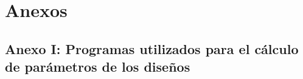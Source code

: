 \section{Anexos}

\subsection{Anexo I: Programas utilizados para el cálculo de parámetros de los diseños}




